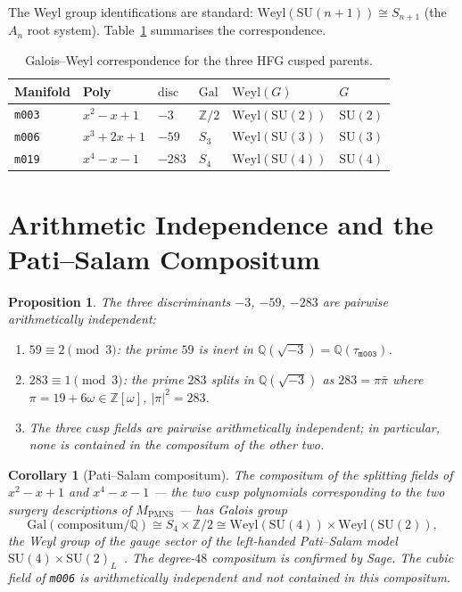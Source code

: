 \documentclass[11pt,a4paper]{article}
\newtheorem{proposition}[theorem]{Proposition}
\newtheorem{corollary}[theorem]{Corollary}
\theoremstyle{definition}
\theoremstyle{remark}
\newcommand{\Z}{\mathbb{Z}}
\newcommand{\Q}{\mathbb{Q}}
\newcommand{\mfld}[1]{\texttt{#1}}
\newcommand{\Gal}{\mathrm{Gal}}
\newcommand{\SU}{\mathrm{SU}}
\newcommand{\Weyl}{\mathrm{Weyl}}
\newcommand{\disc}{\mathrm{disc}}
\begin{document}
The Weyl group identifications are standard:
$\Weyl(\SU(n+1))\cong S_{n+1}$ (the $A_n$ root system).
Table~\ref{tab:main} summarises the correspondence.

\begin{table}[h]
\centering
\caption{Galois--Weyl correspondence for the three HFG cusped parents.}
\label{tab:main}
\begin{tabular}{llllll}
\toprule
Manifold & Poly & $\disc$ & $\Gal$ & $\Weyl(G)$ & $G$ \\
\midrule
\mfld{m003} & $x^2-x+1$ & $-3$   & $\Z/2$ & $\Weyl(\SU(2))$ & $\SU(2)$ \\
\mfld{m006} & $x^3+2x+1$ & $-59$ & $S_3$  & $\Weyl(\SU(3))$ & $\SU(3)$ \\
\mfld{m019} & $x^4-x-1$ & $-283$ & $S_4$  & $\Weyl(\SU(4))$ & $\SU(4)$ \\
\bottomrule
\end{tabular}
\end{table}

\section{Arithmetic Independence and the Pati--Salam Compositum}

\begin{proposition}\label{prop:arith}
The three discriminants $-3$, $-59$, $-283$ are pairwise
arithmetically independent:
\begin{enumerate}
\item $59\equiv2\pmod3$: the prime $59$ is inert in
  $\Q(\sqrt{-3})=\Q(\tau_{\mfld{m003}})$.
\item $283\equiv1\pmod3$: the prime $283$ splits in
  $\Q(\sqrt{-3})$ as $283=\pi\bar\pi$ where
  $\pi=19+6\omega\in\Z[\omega]$, $|\pi|^2=283$.
\item The three cusp fields are pairwise arithmetically
  independent; in particular, none is contained in the
  compositum of the other two.
\end{enumerate}
\end{proposition}

\begin{corollary}[Pati--Salam compositum]\label{cor:ps}
The compositum of the splitting fields of $x^2-x+1$ and
$x^4-x-1$ --- the two cusp polynomials corresponding to the
two surgery descriptions of $M_{\mathrm{PMNS}}$ --- has
Galois group
\[
\Gal(\mathrm{compositum}/\Q) \cong S_4\times\Z/2
\cong \Weyl(\SU(4))\times\Weyl(\SU(2)),
\]
the Weyl group of the gauge sector of the left-handed
Pati--Salam model $\SU(4)\times\SU(2)_L$~\cite{PS}.
The degree-$48$ compositum is confirmed by Sage.
The cubic field of \mfld{m006} is arithmetically independent
and not contained in this compositum.
\end{corollary}
\end{document}
